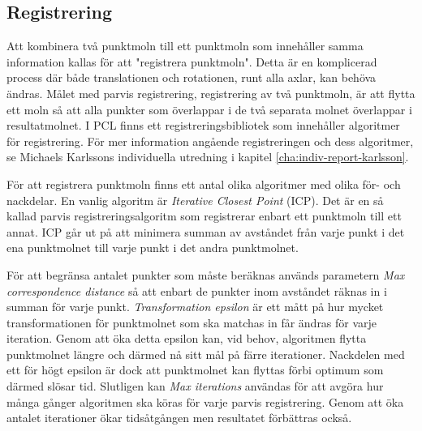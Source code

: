 \subsection{Registrering}
Att kombinera två punktmoln till ett punktmoln som innehåller samma information kallas för att "registrera punktmoln". Detta är en komplicerad process där både translationen och rotationen, runt alla axlar, kan behöva ändras. Målet med parvis registrering, registrering av två punktmoln, är att flytta ett moln så att alla punkter som överlappar i de två separata molnet överlappar i resultatmolnet. I PCL finns ett registreringsbibliotek som innehåller algoritmer för registrering\cite{pcl_registration}. För mer information angående registreringen och dess algoritmer, se Michaels Karlssons individuella utredning i kapitel \ref{cha:indiv-report-karlsson}.  


För att registrera punktmoln finns ett antal olika algoritmer med olika för- och nackdelar. En vanlig algoritm är \textit{Iterative Closest Point} (ICP). Det är en så kallad parvis registreringsalgoritm som registrerar enbart ett punktmoln till ett annat. ICP går ut på att minimera summan av avståndet från varje punkt i det ena punktmolnet till varje punkt i det andra punktmolnet.

För att begränsa antalet punkter som måste beräknas används parametern \textit{Max correspondence distance} så att enbart de punkter inom avståndet räknas in i summan för varje punkt. \textit{Transformation epsilon} är ett mått på hur mycket transformationen för punktmolnet som ska matchas in får ändras för varje iteration. Genom att öka detta epsilon kan, vid behov, algoritmen flytta punktmolnet längre och därmed nå sitt mål på färre iterationer. Nackdelen med ett för högt epsilon är dock att punktmolnet kan flyttas förbi optimum som därmed slösar tid. Slutligen kan \textit{Max iterations} användas för att avgöra hur många gånger algoritmen ska köras för varje parvis registrering. Genom att öka antalet iterationer ökar tidsåtgången men resultatet förbättras också.

